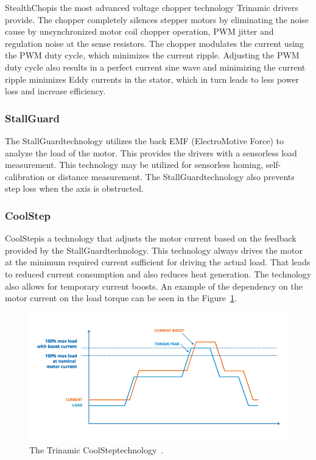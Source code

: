 StealthChop\texttrademark is the most advanced voltage chopper technology Trinamic drivers provide.
The chopper completely silences stepper motors by eliminating the noise cause by unsynchronized motor coil chopper operation, PWM jitter and regulation noise at the sense resistors\cite{trinamic_chopper_nodate}.
The chopper modulates the current using the PWM duty cycle, which minimizes the current ripple\cite{trinamic_chopper_nodate}.
Adjusting the PWM duty cycle also results in a perfect current sine wave and minimizing the current ripple minimizes Eddy currents in the stator, which in turn leads to less power loss and increase efficiency\cite{trinamic_chopper_nodate}.


\subsubsection{StallGuard\texttrademark}
The StallGuard\texttrademark technology utilizes the back EMF (ElectroMotive Force) to analyze the load of the motor.
This provides the drivers with a sensorless load measurement.
This technology may be utilized for sensorless homing, self-calibration or distance measurement.
The StallGuard\texttrademark technology also prevents step loss when the axis is obstructed\cite{trinamic_trinamic_nodate}.

\subsubsection{CoolStep\texttrademark}
CoolStep\texttrademark is a technology that adjusts the motor current based on the feedback provided by the StallGuard\texttrademark technology.
This technology always drives the motor at the minimum required current sufficient for driving the actual load.
That leads to reduced current consumption and also reduces heat generation.
The technology also allows for temporary current boosts.
An example of the dependency on the motor current on the load torque can be seen in the Figure~\ref{fig:torque_current}.

\begin{figure}[H]
    \centering
    \includegraphics[width=\textwidth]{obrazky/Trinamic_CoolStep}
    \caption{The Trinamic CoolStep\texttrademark technology~\cite{trinamic_trinamic_nodate}.}
    \label{fig:torque_current}
\end{figure}
